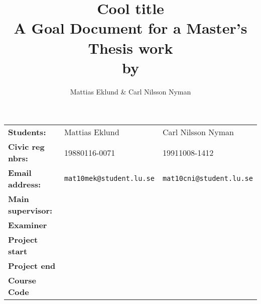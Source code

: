 \documentclass[a4paper]{article}
\title{Cool title\\\large{A Goal Document for a Master's Thesis work\\by}}
\author{Mattias Eklund \& Carl Nilsson Nyman}
\date{}
\begin{document}
\maketitle
\pagebreak

\begin{tabular}{lll}
	\textbf{Students:} & Mattias Eklund & Carl Nilsson Nyman \\
	\textbf{Civic reg nbrs:} & 19880116-0071& 19911008-1412\\
	\textbf{Email address:} & \texttt{mat10mek@student.lu.se}
	& \texttt{mat10cni@student.lu.se} \\
	\textbf{Main supervisor:} & & \\
	\textbf{Examiner} & & \\
	\textbf{Project start} & & \\
	\textbf{Project end} & & \\
	\textbf{Course Code} & & 
\end{tabular}

%
%
%
%
\end{document}
